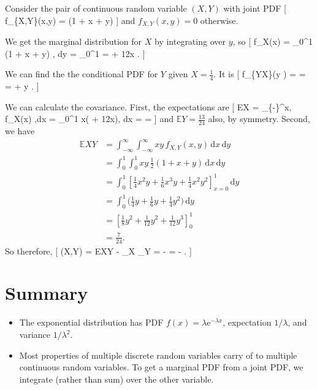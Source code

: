 \documentclass[
  letterpaper,
  DIV=11,
  numbers=noendperiod]{scrreprt}
\providecommand{\tightlist}{%
  \setlength{\itemsep}{0pt}\setlength{\parskip}{0pt}}\usepackage{longtable,booktabs,array}
\theoremstyle{remark}
\begin{document}
Consider the pair of continuous random variable \((X,Y)\) with joint PDF
{[} f\_\{X,Y\}(x,y) = (1 + x + y)
\qquad {} {]} and \(f_{X,Y}(x,y) = 0\)
otherwise.

We get the marginal distribution for \(X\) by integrating over \(y\), so
{[} f\_X(x) = \int\_0\^{}1 (1 + x + y) , \mathrm dy = 
\_0\^{}1 =  + \tfrac12x . {]}

We can find the the conditional PDF for \(Y\) given \(X = \tfrac14\). It
is {[} f\_\{Y\mid X\}\big(y \mid {}\big) =
 =
=  +  y . {]}

We can calculate the covariance. First, the expectations are {[}
\mathbb EX = \int\_\{-\infty\}\^{}\infty x, f\_X(x) ,\mathrm dx =
\int\_0\^{}1 x\big( + \tfrac12x\big), \mathrm dx =
 =  {]} and
\(\mathbb EY = \frac{13}{24}\) also, by symmetry. Second, we have
\begin{align*}
\mathbb EXY
&= \int_{-\infty}^\infty \int_{-\infty}^\infty xy\, f_{X,Y}(x,y) \, \mathrm dx\, \mathrm dy \\
&= \int_0^1 \int_0^1 xy \, \tfrac12(1 + x + y)\, \mathrm dx\, \mathrm dy \\
&= \int_0^1 \left[ \tfrac14 x^2y + \tfrac16 x^3y + \tfrac14 x^2y^2  \right]_{x=0}^1 \, \mathrm dy\\
&= \int_0^1 \big( \tfrac14 y + \tfrac16 y + \tfrac14 y^2 \big) \, \mathrm dy\\
&= \left[ \tfrac18 y^2 + \tfrac{1}{12}y^2 + \tfrac{1}{12}y^3  \right]_0^1 \\
&= \tfrac{7}{24} .
\end{align*} So therefore, {[} (X,Y) = \mathbb EXY -
\mu\_X \mu\_Y =  -  \times {} =
- . {]}

\hypertarget{summary-L17}{%
\section*{Summary}\label{summary-L17}}


\begin{itemize}
\tightlist
\item
  The exponential distribution has PDF
  \(f(x) = \lambda \mathrm e^{-\lambda x}\), expectation \(1/\lambda\),
  and variance \(1/\lambda^2\).
\item
  Most properties of multiple discrete random variables carry of to
  multiple continuous random variables. To get a marginal PDF from a
  joint PDF, we integrate (rather than sum) over the other variable.
\end{itemize}
\end{document}
